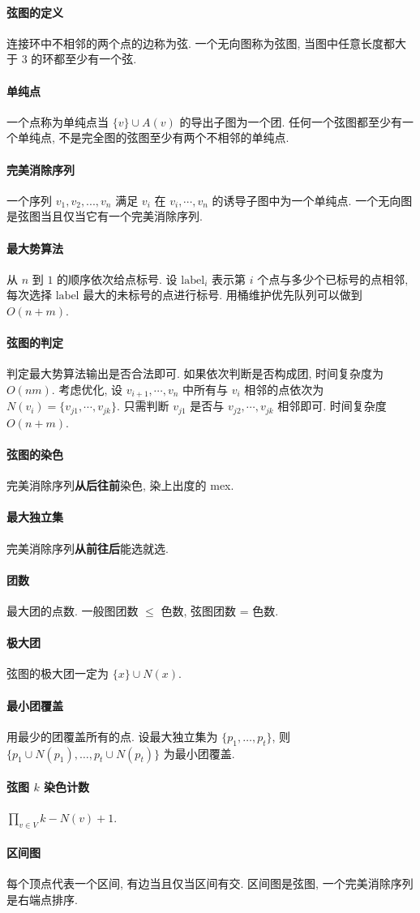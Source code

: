 \paragraph{弦图的定义}连接环中不相邻的两个点的边称为弦. 一个无向图称为弦图, 当图中任意长度都大于 $3$ 的环都至少有一个弦.
\paragraph{单纯点}一个点称为单纯点当 $\{v\}\cup A(v)$ 的导出子图为一个团. 任何一个弦图都至少有一个单纯点, 不是完全图的弦图至少有两个不相邻的单纯点. 
\paragraph{完美消除序列}一个序列 ${v_1,v_2,...,v_n}$ 满足 $v_i$ 在 ${v_i,\cdots,v_n}$ 的诱导子图中为一个单纯点.
一个无向图是弦图当且仅当它有一个完美消除序列.
\paragraph{最大势算法} 从 $n$ 到 $1$ 的顺序依次给点标号. 设 $\mathrm{label}_i$ 表示第 $i$ 个点与多少个已标号的点相邻, 每次选择 $\mathrm{label}$ 最大的未标号的点进行标号. 用桶维护优先队列可以做到 $O(n + m)$. 
\paragraph{弦图的判定} 判定最大势算法输出是否合法即可. 如果依次判断是否构成团, 时间复杂度为 $O(nm)$.
考虑优化, 设 ${v_{i+1},\cdots,v_n}$ 中所有与 $v_i$ 相邻的点依次为 $N(v_i) = \{v_{j1},\cdots,v_{jk}\}$. 
只需判断 $v_{j1}$ 是否与 $v_{j2},\cdots,v_{jk}$ 相邻即可. 时间复杂度$O(n+m)$.
\paragraph{弦图的染色} 完美消除序列\textbf{从后往前}染色, 染上出度的 mex.
\paragraph{最大独立集} 完美消除序列\textbf{从前往后}能选就选.
\paragraph{团数} 最大团的点数. 一般图团数 $\leq$ 色数, 弦图团数 = 色数. 
\paragraph{极大团} 弦图的极大团一定为 $\{x\} \cup N(x)$.
\paragraph{最小团覆盖} 用最少的团覆盖所有的点. 设最大独立集为 $\{p_1, \dots ,p_t\}$, 
则 $\{p_1\cup N(p_1), \dots , p_t \cup N(p_t)\}$ 为最小团覆盖.
\paragraph{弦图 $k$ 染色计数} $\prod_{v\in V} k - N(v) + 1$.
\paragraph{区间图} 每个顶点代表一个区间, 有边当且仅当区间有交. 区间图是弦图, 一个完美消除序列是右端点排序.
